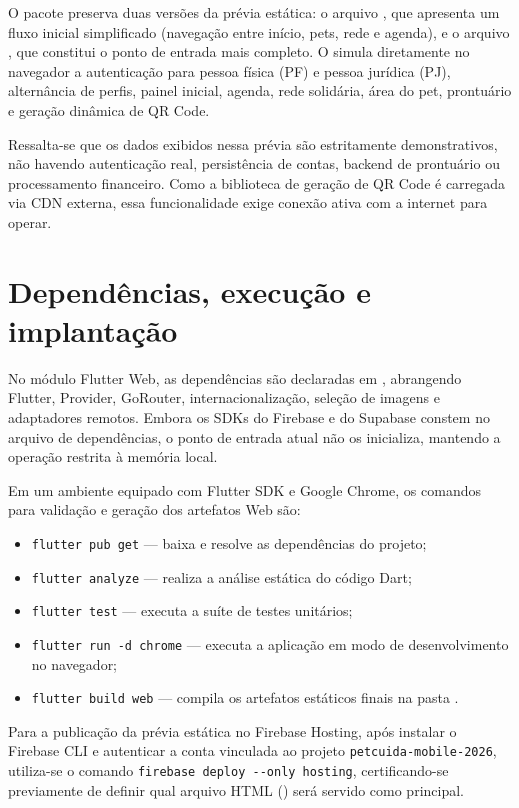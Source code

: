 \documentclass[12pt,a4paper]{article}
\begin{document}
O pacote preserva duas versões da prévia estática: o arquivo , que apresenta um fluxo inicial simplificado (navegação entre início, pets, rede e agenda), e o arquivo , que constitui o ponto de entrada mais completo. O  simula diretamente no navegador a autenticação para pessoa física (PF) e pessoa jurídica (PJ), alternância de perfis, painel inicial, agenda, rede solidária, área do pet, prontuário e geração dinâmica de QR Code.

Ressalta-se que os dados exibidos nessa prévia são estritamente demonstrativos, não havendo autenticação real, persistência de contas, backend de prontuário ou processamento financeiro. Como a biblioteca de geração de QR Code é carregada via CDN externa, essa funcionalidade exige conexão ativa com a internet para operar.

\section{Dependências, execução e implantação}
No módulo Flutter Web, as dependências são declaradas em , abrangendo Flutter, Provider, GoRouter, internacionalização, seleção de imagens e adaptadores remotos. Embora os SDKs do Firebase e do Supabase constem no arquivo de dependências, o ponto de entrada atual não os inicializa, mantendo a operação restrita à memória local.

Em um ambiente equipado com Flutter SDK e Google Chrome, os comandos para validação e geração dos artefatos Web são:

\begin{itemize}[leftmargin=*]
  \item \texttt{flutter pub get} --- baixa e resolve as dependências do projeto;
  \item \texttt{flutter analyze} --- realiza a análise estática do código Dart;
  \item \texttt{flutter test} --- executa a suíte de testes unitários;
  \item \texttt{flutter run -d chrome} --- executa a aplicação em modo de desenvolvimento no navegador;
  \item \texttt{flutter build web} --- compila os artefatos estáticos finais na pasta .
\end{itemize}

Para a publicação da prévia estática no Firebase Hosting, após instalar o Firebase CLI e autenticar a conta vinculada ao projeto \texttt{petcuida-mobile-2026}, utiliza-se o comando \texttt{firebase deploy -{}-only hosting}, certificando-se previamente de definir qual arquivo HTML () será servido como  principal.
\end{document}
